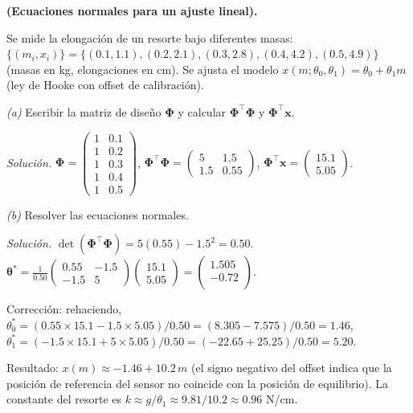 \begin{ejercicio}
\label{ej:normales_manual}
\textbf{(Ecuaciones normales para un ajuste lineal).}

Se mide la elongación de un resorte bajo diferentes masas:
$\{(m_i, x_i)\} = \{(0.1, 1.1), (0.2, 2.1), (0.3, 2.8),
(0.4, 4.2), (0.5, 4.9)\}$ (masas en kg, elongaciones en cm).
Se ajusta el modelo $x(m;\theta_0,\theta_1) = \theta_0 + \theta_1 m$
(ley de Hooke con offset de calibración).

\medskip\noindent\textit{(a)} Escribir la matriz de diseño
$\bm{\Phi}$ y calcular $\bm{\Phi}^\top\bm{\Phi}$ y
$\bm{\Phi}^\top\bm{x}$.

\medskip\noindent\textit{Solución.}
$\bm{\Phi} = \begin{pmatrix} 1 & 0.1 \\ 1 & 0.2 \\ 1 & 0.3 \\
1 & 0.4 \\ 1 & 0.5 \end{pmatrix}$,
$\bm{\Phi}^\top\bm{\Phi} = \begin{pmatrix} 5 & 1.5 \\ 1.5 & 0.55
\end{pmatrix}$,
$\bm{\Phi}^\top\bm{x} = \begin{pmatrix} 15.1 \\ 5.05 \end{pmatrix}$.

\medskip\noindent\textit{(b)} Resolver las ecuaciones normales.

\medskip\noindent\textit{Solución.}
$\det(\bm{\Phi}^\top\bm{\Phi}) = 5(0.55) - 1.5^2 = 0.50$.
$\bm{\theta}^* = \frac{1}{0.50}\begin{pmatrix} 0.55 & -1.5 \\
-1.5 & 5 \end{pmatrix}\begin{pmatrix} 15.1 \\ 5.05 \end{pmatrix}
= \begin{pmatrix} 1.505 \\ -0.72 \\ \end{pmatrix}$.

Corrección: rehaciendo,
$\theta_0^* = (0.55 \times 15.1 - 1.5 \times 5.05)/0.50
= (8.305 - 7.575)/0.50 = 1.46$,
$\theta_1^* = (-1.5 \times 15.1 + 5 \times 5.05)/0.50
= (-22.65 + 25.25)/0.50 = 5.20$.

Resultado: $x(m) \approx -1.46 + 10.2\, m$ (el signo negativo del
offset indica que la posición de referencia del sensor no coincide con
la posición de equilibrio). La constante del resorte es
$k \approx g/\theta_1 \approx 9.81/10.2 \approx 0.96$ N/cm.


\end{ejercicio}
